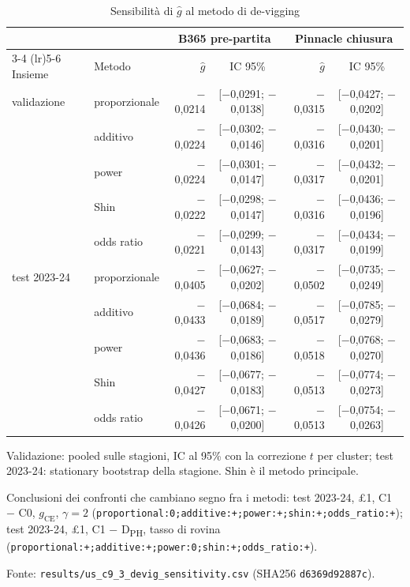 \begin{table}[htbp]
\centering
\small
\caption{Sensibilità di $\hat g$ al metodo di de-vigging}
\label{tab:devig}
\begin{tabular}{llrcrc}
\toprule
 &  & \multicolumn{2}{c}{B365 pre-partita} & \multicolumn{2}{c}{Pinnacle chiusura} \\
\cmidrule(lr){3-4} \cmidrule(lr){5-6}
Insieme & Metodo & $\hat g$ & IC 95\% & $\hat g$ & IC 95\% \\
\midrule
validazione & proporzionale & $-$0,0214 & [$-$0,0291; $-$0,0138] & $-$0,0315 & [$-$0,0427; $-$0,0202] \\
 & additivo & $-$0,0224 & [$-$0,0302; $-$0,0146] & $-$0,0316 & [$-$0,0430; $-$0,0201] \\
 & power & $-$0,0224 & [$-$0,0301; $-$0,0147] & $-$0,0317 & [$-$0,0432; $-$0,0201] \\
 & Shin & $-$0,0222 & [$-$0,0298; $-$0,0147] & $-$0,0316 & [$-$0,0436; $-$0,0196] \\
 & odds ratio & $-$0,0221 & [$-$0,0299; $-$0,0143] & $-$0,0317 & [$-$0,0434; $-$0,0199] \\
\midrule
test 2023-24 & proporzionale & $-$0,0405 & [$-$0,0627; $-$0,0202] & $-$0,0502 & [$-$0,0735; $-$0,0249] \\
 & additivo & $-$0,0433 & [$-$0,0684; $-$0,0189] & $-$0,0517 & [$-$0,0785; $-$0,0279] \\
 & power & $-$0,0436 & [$-$0,0683; $-$0,0186] & $-$0,0518 & [$-$0,0768; $-$0,0270] \\
 & Shin & $-$0,0427 & [$-$0,0677; $-$0,0183] & $-$0,0513 & [$-$0,0774; $-$0,0273] \\
 & odds ratio & $-$0,0426 & [$-$0,0671; $-$0,0200] & $-$0,0513 & [$-$0,0754; $-$0,0263] \\
\bottomrule
\end{tabular}

\smallskip
\begin{minipage}{\linewidth}
\footnotesize
Validazione: pooled sulle stagioni, IC al 95\% con la correzione $t$ per cluster; test 2023-24: stationary bootstrap della stagione. Shin è il metodo principale.\par
Conclusioni dei confronti che cambiano segno fra i metodi: test 2023-24, \pounds{}1, C1 $-$ C0, $g_{\mathrm{CE}}$, $\gamma = 2$ (\texttt{proportional:0;additive:+;power:+;shin:+;odds\_ratio:+}); test 2023-24, \pounds{}1, C1 $-$ D\textsubscript{PH}, tasso di rovina (\texttt{proportional:+;additive:+;power:0;shin:+;odds\_ratio:+}).\par
Fonte: \texttt{results/us\_c9\_3\_devig\_sensitivity.csv} (SHA256 \texttt{d6369d92887c}).
\end{minipage}
\end{table}

